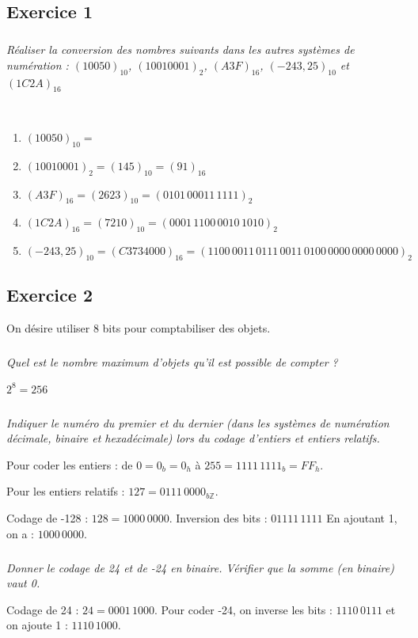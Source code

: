\documentclass[10pt,fleqn]{article} %
\begin{document}
\begin{multicols}{2}
\subsection*{Exercice 1}
\setcounter{subparagraph}{0}
\subparagraph{}\textit{Réaliser la conversion des nombres suivants dans les autres systèmes de numération : $(10050)_{10}$, $(1001 0001)_{2}$, $(A3F)_{16}$, $(-243,25)_{10}$ et $(1C2A)_{16}$}
\ifprof
\begin{corrige}~\\
\begin{enumerate}
\item $(10050)_{10}=$
\item $(1001 0001)_{2}=(145)_{10}=(91)_{16}$
\item $(A3F)_{16}=(2623)_{10}=(0101\, 00011\, 1111)_{2}$
\item $(1C2A)_{16}=(7210)_{10}=(0001\,1100\,0010\,1010)_{2}$
\item $(-243,25)_{10}=(C3734000)_{16} = (1100\,0011\, 0111\,0011\, 0100\,0000\, 0000\,0000)_{2}$
\end{enumerate}
\end{corrige}
\else
\fi


\subsection*{Exercice 2}
\setcounter{subparagraph}{0}
On désire utiliser 8 bits pour comptabiliser des objets.
\subparagraph{}\textit{Quel est le nombre maximum d’objets qu’il est possible de compter ?}
\ifprof
\begin{corrige}
$2^8  = 256$
\end{corrige}
\else
\fi
\subparagraph{}\textit{Indiquer le numéro du premier et du dernier (dans les systèmes de numération décimale, binaire et hexadécimale) lors du codage d'entiers et entiers relatifs.}
\ifprof
\begin{corrige}
Pour coder les entiers : de $0 = 0_b=0_h$ à $255=1111\,1111_b=FF_h$.

Pour les entiers relatifs : $127=0111\,0000_{b\mathbb{Z}}$.

Codage de -128 : $128=1000\,0000$. Inversion des bits : $01111\,1111$ En ajoutant 1, on a : $1000\,0000$.  

\end{corrige}
\else
\fi
\subparagraph{}\textit{Donner le codage de 24 et de -24 en binaire. Vérifier que la somme (en binaire) vaut 0. }
\ifprof
\begin{corrige}
Codage de 24 : $24=0001\,1000$. Pour coder -24, on inverse les bits : $1110\,0111$ et on ajoute 1 : $1110\,1000$.


\end{corrige}
\end{multicols}
\end{document}

